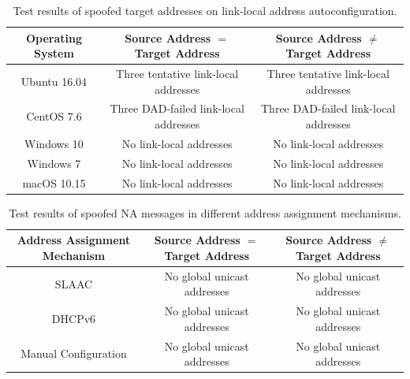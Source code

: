 \documentclass[a4paper,fleqn]{cas-dc}
\begin{document}
        \begin{table}
                \centering
                \caption{Test results of spoofed target addresses on link-local address autoconfiguration.}
                \begin{tabular}{|c||c|c|}
                    \hline
                    \textbf{Operating System} & 
                    \textbf{Source Address $=$ Target Address} & 
                    \textbf{Source Address $\neq$ Target Address} \\
                    \hline
                    \hline
                    Ubuntu 16.04 & Three tentative link-local addresses & Three tentative link-local addresses \\
                    \hline
                    CentOS 7.6 & Three DAD-failed link-local addresses & Three DAD-failed link-local addresses \\
                    \hline
                    Windows 10 & No link-local addresses & No link-local addresses \\
                    \hline
                    Windows 7 & No link-local addresses & No link-local addresses \\
                    \hline
                    macOS 10.15 & No link-local addresses & No link-local addresses \\
                    \hline
                \end{tabular}
                \label{tab:subnetLocal}
            \end{table}

            \begin{table}
                \centering
                \caption{Test results of spoofed NA messages in different address assignment mechanisms.}
                \begin{tabular}{|c||c|c|}
                    \hline
                    \textbf{Address Assignment Mechanism} & \textbf{Source Address $=$ Target Address} & \textbf{Source Address $\neq$ Target Address} \\
                    \hline
                    \hline
                    SLAAC & No global unicast addresses & No global unicast addresses \\
                    \hline
                    DHCPv6 & No global unicast addresses & No global unicast addresses \\
                    \hline
                    Manual Configuration & No global unicast addresses & No global unicast addresses \\
                    \hline
                \end{tabular}
                \label{tab:AddressAllocation}
            \end{table}
    
\end{document}
